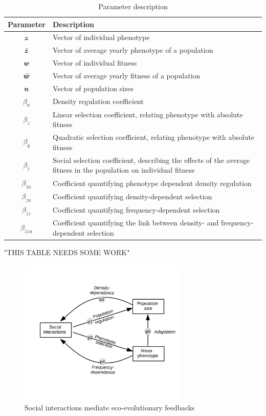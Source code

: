 \documentclass{article}
\begin{document}
\newpage
\begin{table}
	\begin{singlespace}
		\begin{tabular}{|c|p{12cm}|} 
			\hline
			
			Parameter & Description \\ 
			\hline
			$\vectorsym{z}$        & Vector of individual phenotype \\ 
			$\bar{\vectorsym{z}}$  & Vector of average yearly phenotype of a population\\ 
			$\vectorsym{w}$        & Vector of individual fitness \\ 
			$\bar{\vectorsym{w}}$  & Vector of average yearly fitness of a population\\ 
			$\vectorsym{n}$        & Vector of population sizes \\ 
			$\beta_n$              & Density regulation coefficient \\ 
			$\beta_z$              & Linear selection coefficient, relating phenotype with absolute fitness \\ 
			$\beta_q$              & Quadratic selection coefficient, relating phenotype with absolute fitness \\ 
			$\beta_{\bar{z}}$      & Social selection coefficient, describing the effects of the average fitness in the population on individual fitness \\ 
			$\beta_{\bar{z}n}$     & Coefficient quantifying phenotype dependent density regulation \\ 
			$\beta_{zn}$           & Coefficient quantifying density-dependent selection \\ 
			$\beta_{\bar{z}z}$     & Coefficient quantifying frequency-dependent selection \\ 
			$\beta_{\bar{z}zn}$    & Coefficient quantifying the link between density- and frequency-dependent selection\\ 
			\hline
		\end{tabular}
		\caption{Parameter description  }
	\end{singlespace}
\end{table}

"THIS TABLE NEEDS SOME WORK"

  
\begin{figure}[ht]
	\centering
	\includegraphics[width=8cm, height=7cm]{Figures/Fig1.jpg}
	\caption{Social interactions mediate eco-evolutionary feedbacks}
\end{figure}
\end{document}

